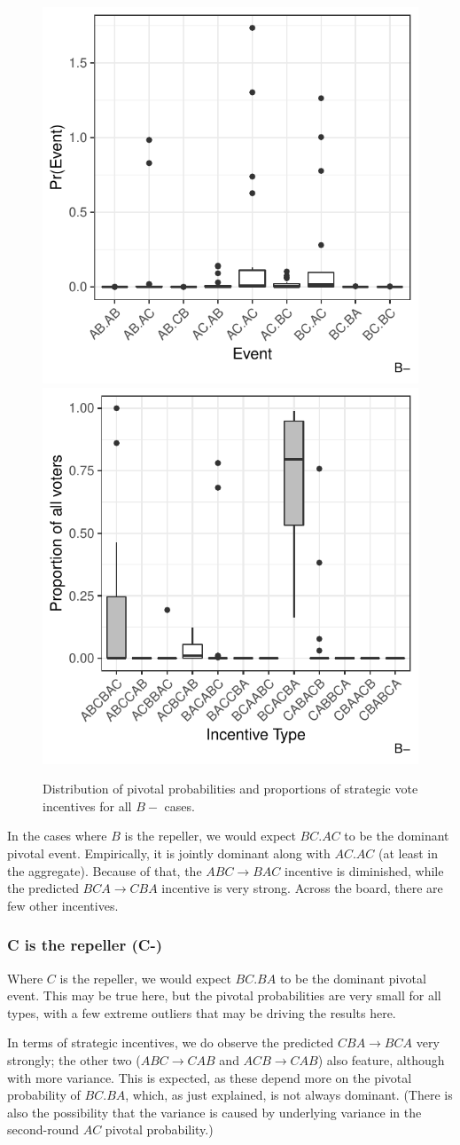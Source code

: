 \documentclass[11pt, letter]{article}
\begin{document}
\begin{figure}[!htb]
	\centering
	\includegraphics[width = .45\textwidth]{../output/figures/prediction/pprob_dm_b.pdf}
	\includegraphics[width = .45\textwidth]{../output/figures/prediction/svinc_dm_b.pdf}
	\caption{Distribution of pivotal probabilities and proportions of strategic vote incentives for all $B-$ cases.}
	\label{fig:figure1}
\end{figure}

In the cases where $B$ is the repeller, we would expect $BC.AC$ to be the dominant pivotal event. Empirically, it is jointly dominant along with $AC.AC$ (at least in the aggregate). Because of that, the $ABC \rightarrow BAC$ incentive is diminished, while the predicted $BCA \rightarrow CBA$ incentive is very strong. Across the board, there are few other incentives.

\subsubsection{C is the repeller (C-)}

Where $C$ is the repeller, we would expect $BC.BA$ to be the dominant pivotal event. This may be true here, but the pivotal probabilities are very small for all types, with a few extreme outliers that may be driving the results here.

In terms of strategic incentives, we do observe the predicted $CBA \rightarrow BCA$ very strongly; the other two ($ABC \rightarrow CAB$ and $ACB \rightarrow CAB$) also feature, although with more variance. This is expected, as these depend more on the pivotal probability of $BC.BA$, which, as just explained, is not always dominant. (There is also the possibility that the variance is caused by underlying variance in the second-round $AC$ pivotal probability.)
\end{document}
